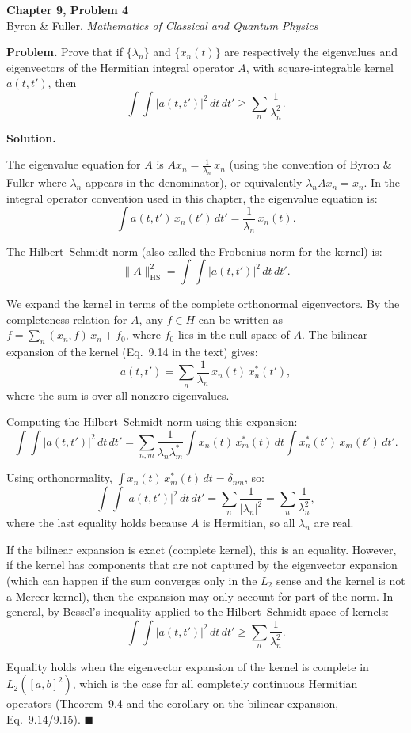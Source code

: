 \documentclass[12pt]{article}
\begin{document}
\begin{center}
{\Large\bfseries Chapter 9, Problem 4}\\[6pt]
Byron \& Fuller, \textit{Mathematics of Classical and Quantum Physics}
\end{center}

\bigskip

\textbf{Problem.} Prove that if $\{\lambda_n\}$ and $\{x_n(t)\}$ are respectively the eigenvalues and eigenvectors of the Hermitian integral operator $A$, with square-integrable kernel $a(t,t')$, then
\[
\int \!\!\int |a(t,t')|^2\,dt\,dt' \ge \sum_n \frac{1}{\lambda_n^2}.
\]

\bigskip
\textbf{Solution.}

The eigenvalue equation for $A$ is $Ax_n = \frac{1}{\lambda_n}\,x_n$ (using the convention of Byron \& Fuller where $\lambda_n$ appears in the denominator), or equivalently $\lambda_n A x_n = x_n$. In the integral operator convention used in this chapter, the eigenvalue equation is:
\[
\int a(t,t')\,x_n(t')\,dt' = \frac{1}{\lambda_n}\,x_n(t).
\]

The Hilbert--Schmidt norm (also called the Frobenius norm for the kernel) is:
\[
\|A\|_{\text{HS}}^2 = \int\!\!\int |a(t,t')|^2\,dt\,dt'.
\]

We expand the kernel in terms of the complete orthonormal eigenvectors. By the completeness relation for $A$, any $f \in H$ can be written as $f = \sum_n (x_n, f)\,x_n + f_0$, where $f_0$ lies in the null space of $A$. The bilinear expansion of the kernel (Eq.~9.14 in the text) gives:
\[
a(t,t') = \sum_n \frac{1}{\lambda_n}\,x_n(t)\,x_n^*(t'),
\]
where the sum is over all nonzero eigenvalues.

Computing the Hilbert--Schmidt norm using this expansion:
\[
\int\!\!\int |a(t,t')|^2\,dt\,dt' = \sum_{n,m} \frac{1}{\lambda_n \lambda_m^*} \int x_n(t)\,x_m^*(t)\,dt \int x_n^*(t')\,x_m(t')\,dt'.
\]

Using orthonormality, $\int x_n(t)\,x_m^*(t)\,dt = \delta_{nm}$, so:
\[
\int\!\!\int |a(t,t')|^2\,dt\,dt' = \sum_n \frac{1}{|\lambda_n|^2} = \sum_n \frac{1}{\lambda_n^2},
\]
where the last equality holds because $A$ is Hermitian, so all $\lambda_n$ are real.

If the bilinear expansion is exact (complete kernel), this is an equality. However, if the kernel has components that are not captured by the eigenvector expansion (which can happen if the sum converges only in the $L_2$ sense and the kernel is not a Mercer kernel), then the expansion may only account for part of the norm. In general, by Bessel's inequality applied to the Hilbert--Schmidt space of kernels:
\[
\boxed{\int\!\!\int |a(t,t')|^2\,dt\,dt' \ge \sum_n \frac{1}{\lambda_n^2}}.
\]

Equality holds when the eigenvector expansion of the kernel is complete in $L_2([a,b]^2)$, which is the case for all completely continuous Hermitian operators (Theorem~9.4 and the corollary on the bilinear expansion, Eq.~9.14/9.15). \hfill $\blacksquare$
\end{document}
